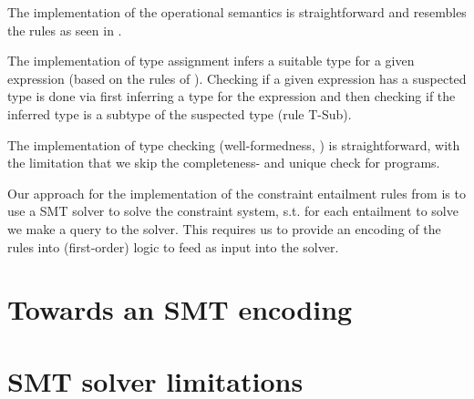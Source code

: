 \documentclass[a4paper]{article}
\begin{document}
The implementation of the operational semantics is straightforward and resembles
the rules as seen in .

The implementation of type assignment infers a suitable type for a given expression
(based on the rules of ).
Checking if a given expression has a suspected type is done via
first inferring a type for the expression and then checking if the inferred type
is a subtype of the suspected type (rule T-Sub).

The implementation of type checking (well-formedness, ) is straightforward,
with the limitation that we skip the completeness- and unique check for programs.

Our approach for the implementation of the constraint entailment rules
from  is to use a SMT solver to solve the constraint system,
s.t. for each entailment to solve we make a query to the solver.
This requires us to provide an encoding of the rules into (first-order) logic
to feed as input into the solver.

\section{Towards an SMT encoding}

\section{SMT solver limitations}
\end{document}
